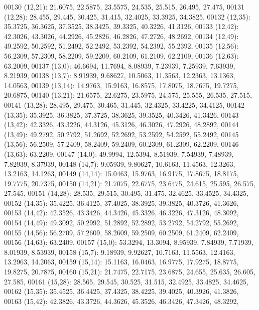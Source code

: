\begin{DoxyCode}
00130       (12,21): 21.6075, 22.5875, 23.5575, 24.535, 25.515, 26.495, 27.475,
00131       (12,28): 28.455, 29.445, 30.425, 31.415, 32.4025, 33.3925, 34.3825,
00132       (12,35): 35.3725, 36.3625, 37.3525, 38.3425, 39.3325, 40.3226, 41.3126,
00133       (12,42): 42.3026, 43.3026, 44.2926, 45.2826, 46.2826, 47.2726, 48.2692,
00134       (12,49): 49.2592, 50.2592, 51.2492, 52.2492, 53.2392, 54.2392, 55.2392,
00135       (12,56): 56.2309, 57.2309, 58.2209, 59.2209, 60.2109, 61.2109, 62.2109,
00136       (12,63): 63.2009,
00137       (13,0): 46.6694, 11.7694, 8.08939, 7.23939, 7.25939, 7.63939, 8.21939,
00138       (13,7): 8.91939, 9.68627, 10.5063, 11.3563, 12.2363, 13.1363, 14.0563,
00139       (13,14): 14.9763, 15.9163, 16.8575, 17.8075, 18.7675, 19.7275, 20.6875,
00140       (13,21): 21.6575, 22.6275, 23.5975, 24.575, 25.555, 26.535, 27.515,
00141       (13,28): 28.495, 29.475, 30.465, 31.445, 32.4325, 33.4225, 34.4125,
00142       (13,35): 35.3925, 36.3825, 37.3725, 38.3625, 39.3525, 40.3426, 41.3426,
00143       (13,42): 42.3326, 43.3226, 44.3126, 45.3126, 46.3026, 47.2926, 48.2892,
00144       (13,49): 49.2792, 50.2792, 51.2692, 52.2692, 53.2592, 54.2592, 55.2492,
00145       (13,56): 56.2509, 57.2409, 58.2409, 59.2409, 60.2309, 61.2309, 62.2209,
00146       (13,63): 63.2209,
00147       (14,0): 49.9994, 12.5394, 8.51939, 7.54939, 7.48939, 7.82939, 8.37939,
00148       (14,7): 9.05939, 9.80627, 10.6163, 11.4563, 12.3263, 13.2163, 14.1263,
00149       (14,14): 15.0463, 15.9763, 16.9175, 17.8675, 18.8175, 19.7775, 20.7375,
00150       (14,21): 21.7075, 22.6775, 23.6475, 24.615, 25.595, 26.575, 27.545,
00151       (14,28): 28.535, 29.515, 30.495, 31.475, 32.4625, 33.4525, 34.4325,
00152       (14,35): 35.4225, 36.4125, 37.4025, 38.3925, 39.3825, 40.3726, 41.3626,
00153       (14,42): 42.3526, 43.3426, 44.3426, 45.3326, 46.3226, 47.3126, 48.3092,
00154       (14,49): 49.3092, 50.2992, 51.2892, 52.2892, 53.2792, 54.2792, 55.2692,
00155       (14,56): 56.2709, 57.2609, 58.2609, 59.2509, 60.2509, 61.2409, 62.2409,
00156       (14,63): 63.2409,
00157       (15,0): 53.3294, 13.3094, 8.95939, 7.84939, 7.71939, 8.01939, 8.53939,
00158       (15,7): 9.18939, 9.92627, 10.7163, 11.5563, 12.4163, 13.2963, 14.2063,
00159       (15,14): 15.1163, 16.0463, 16.9775, 17.9275, 18.8775, 19.8275, 20.7875,
00160       (15,21): 21.7475, 22.7175, 23.6875, 24.655, 25.635, 26.605, 27.585,
00161       (15,28): 28.565, 29.545, 30.525, 31.515, 32.4925, 33.4825, 34.4625,
00162       (15,35): 35.4525, 36.4425, 37.4325, 38.4225, 39.4025, 40.3926, 41.3826,
00163       (15,42): 42.3826, 43.3726, 44.3626, 45.3526, 46.3426, 47.3426, 48.3292,

\end{DoxyCode}
